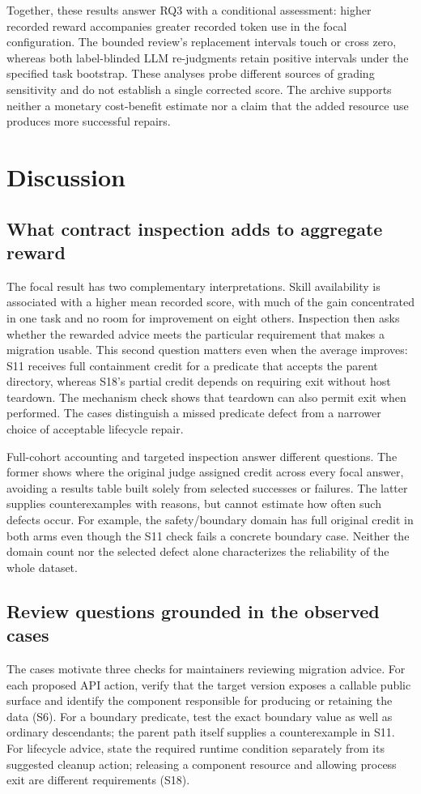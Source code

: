 \documentclass[11pt]{article}
\begin{document}
Together, these results answer RQ3 with a conditional assessment: higher recorded reward accompanies greater recorded token use in the focal configuration. The bounded review's replacement intervals touch or cross zero, whereas both label-blinded LLM re-judgments retain positive intervals under the specified task bootstrap. These analyses probe different sources of grading sensitivity and do not establish a single corrected score. The archive supports neither a monetary cost-benefit estimate nor a claim that the added resource use produces more successful repairs.

\section{Discussion}
\subsection{What contract inspection adds to aggregate reward}
The focal result has two complementary interpretations. Skill availability is associated with a higher mean recorded score, with much of the gain concentrated in one task and no room for improvement on eight others. Inspection then asks whether the rewarded advice meets the particular requirement that makes a migration usable. This second question matters even when the average improves: S11 receives full containment credit for a predicate that accepts the parent directory, whereas S18's partial credit depends on requiring exit without host teardown. The mechanism check shows that teardown can also permit exit when performed. The cases distinguish a missed predicate defect from a narrower choice of acceptable lifecycle repair.

Full-cohort accounting and targeted inspection answer different questions. The former shows where the original judge assigned credit across every focal answer, avoiding a results table built solely from selected successes or failures. The latter supplies counterexamples with reasons, but cannot estimate how often such defects occur. For example, the safety/boundary domain has full original credit in both arms even though the S11 check fails a concrete boundary case. Neither the domain count nor the selected defect alone characterizes the reliability of the whole dataset.

\subsection{Review questions grounded in the observed cases}\label{sec:review_questions}
The cases motivate three checks for maintainers reviewing migration advice. For each proposed API action, verify that the target version exposes a callable public surface and identify the component responsible for producing or retaining the data (S6). For a boundary predicate, test the exact boundary value as well as ordinary descendants; the parent path itself supplies a counterexample in S11. For lifecycle advice, state the required runtime condition separately from its suggested cleanup action; releasing a component resource and allowing process exit are different requirements (S18).
\end{document}
